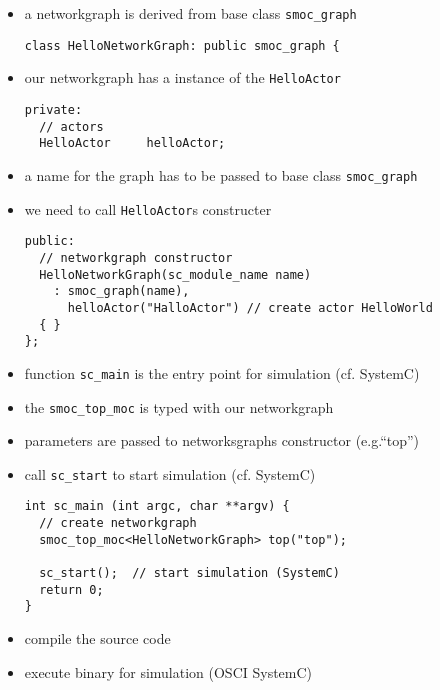 \begin{frame}[fragile=singleslide]
\begin{itemize}
\item a networkgraph is derived from base class \lstinline!smoc_graph!
\begin{lstlisting}
class HelloNetworkGraph: public smoc_graph {
\end{lstlisting}
\item our networkgraph has a instance of the \lstinline!HelloActor!
\begin{lstlisting}
private:
  // actors
  HelloActor     helloActor;
\end{lstlisting}
\item a name for the graph has to be passed to base class \lstinline!smoc_graph!
\item we need to call \lstinline!HelloActor!s constructer
\begin{lstlisting}
public:
  // networkgraph constructor
  HelloNetworkGraph(sc_module_name name)
    : smoc_graph(name),
      helloActor("HalloActor") // create actor HelloWorld
  { }
};
\end{lstlisting}
\end{itemize}
\end{frame}

\begin{frame}[fragile=singleslide]
\begin{itemize}
\item function \lstinline!sc_main! is the entry point for simulation (cf. SystemC)
\item the \lstinline!smoc_top_moc! is typed with our networkgraph
\item parameters are passed to networksgraphs constructor (e.g.``top'')
\item call \lstinline!sc_start! to start simulation (cf. SystemC)
\begin{lstlisting}
int sc_main (int argc, char **argv) {
  // create networkgraph
  smoc_top_moc<HelloNetworkGraph> top("top");

  sc_start();  // start simulation (SystemC)
  return 0;
}
\end{lstlisting}
\item compile the source code
\item execute binary for simulation (OSCI SystemC)
\end{itemize}
\end{frame}


